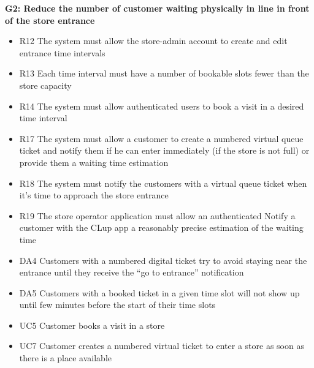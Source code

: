 \vfill
\pagebreak

\textbf{G2: Reduce the number of customer waiting physically in line in front of the store entrance}
\begin{itemize}[label=\textcolor{clup_blue2}{\textbullet}]
    \item R12 The system must allow the store-admin account to create and edit entrance time intervals
    \item R13 Each time interval must have a number of bookable slots fewer than the store capacity
    \item R14 The system must allow authenticated users to book a visit in a desired time interval
    \item R17 The system must allow a customer to create a numbered virtual queue ticket and notify them if he can enter immediately (if the store is not full) or provide them a waiting time estimation
    \item R18 The system must notify the customers with a virtual queue ticket when it’s time to approach the store entrance
    \item R19 The store operator application must allow an authenticated Notify a customer with the CLup app a reasonably precise estimation of the waiting time
    \item DA4 Customers with a numbered digital ticket try to avoid staying near the entrance until they receive the “go to entrance” notification
    \item DA5 Customers with a booked ticket in a given time slot will not show up until few minutes before the start of their time slots
\end{itemize}
\begin{itemize}[label=\textcolor{clup_yellow}{\textbullet}]
    \item UC5 Customer books a visit in a store
    \item UC7 Customer creates a numbered virtual ticket to enter a store as soon as there is a place available
\end{itemize}


